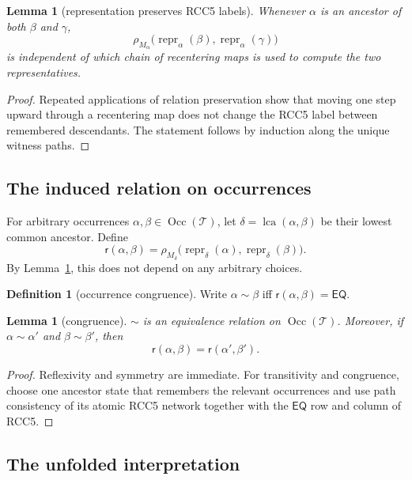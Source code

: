 \documentclass[11pt]{article}
\newtheorem{lemma}[theorem]{Lemma}
\theoremstyle{definition}
\newtheorem{definition}[theorem]{Definition}
\newcommand{\Eq}{\mathsf{EQ}}
\newcommand{\repr}{\operatorname{repr}}
\newcommand{\lca}{\operatorname{lca}}
\newcommand{\occ}{\operatorname{Occ}}
\begin{document}
\begin{lemma}[representation preserves RCC5 labels]\label{lem:repr-rel}
Whenever $\alpha$ is an ancestor of both $\beta$ and $\gamma$,
\[
\rho_{M_\alpha}\bigl(\repr_\alpha(\beta),\repr_\alpha(\gamma)\bigr)
\]
is independent of which chain of recentering maps is used to compute the two representatives.
\end{lemma}

\begin{proof}
Repeated applications of relation preservation show that moving one step upward through a recentering map does not change the RCC5 label between remembered descendants. The statement follows by induction along the unique witness paths.
\end{proof}

\subsection{The induced relation on occurrences}

For arbitrary occurrences $\alpha,\beta\in \occ(\mathcal T)$, let $\delta=\lca(\alpha,\beta)$ be their lowest common ancestor. Define
\[
\mathsf r(\alpha,\beta)=
\rho_{M_\delta}\bigl(\repr_\delta(\alpha),\repr_\delta(\beta)\bigr).
\]
By Lemma~\ref{lem:repr-rel}, this does not depend on any arbitrary choices.

\begin{definition}[occurrence congruence]
Write $\alpha\sim\beta$ iff $\mathsf r(\alpha,\beta)=\Eq$.
\end{definition}

\begin{lemma}[congruence]\label{lem:cong}
$\sim$ is an equivalence relation on $\occ(\mathcal T)$. Moreover, if $\alpha\sim\alpha'$ and $\beta\sim\beta'$, then
\[
\mathsf r(\alpha,\beta)=\mathsf r(\alpha',\beta').
\]
\end{lemma}

\begin{proof}
Reflexivity and symmetry are immediate. For transitivity and congruence, choose one ancestor state that remembers the relevant occurrences and use path consistency of its atomic RCC5 network together with the $\Eq$ row and column of RCC5.
\end{proof}

\subsection{The unfolded interpretation}
\end{document}

